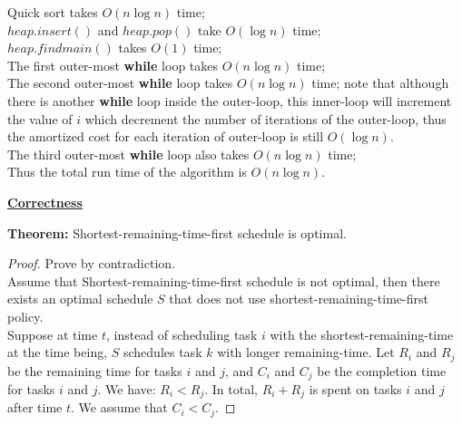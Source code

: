 \documentclass[11pt]{article}
\begin{document}
\begin{enumerate}
\begin{enumerate}
Quick sort takes $O(n\log n)$ time;\\
$heap.insert()$ and $heap.pop()$ take $O(\log n)$ time;\\
$heap.findmain()$ takes $O(1)$ time;\\
The first outer-most \textbf{while} loop takes $O(n\log n)$ time;\\
The second outer-most \textbf{while} loop takes $O(n\log n)$ time;
note that although there is another \textbf{while} loop inside the
outer-loop, this inner-loop will increment the value of $i$
which decrement the number of iterations of the outer-loop, thus the
amortized cost for each iteration of outer-loop is still $O(\log
n)$.\\
The third outer-most \textbf{while} loop also takes $O(n\log n)$ time;\\
Thus the total run time of the algorithm is $O(n\log n)$.

\underline{\textbf{Correctness}}

\textbf{Theorem:} Shortest-remaining-time-first schedule is optimal.

\begin{proof}
  Prove by contradiction.\\
  Assume that Shortest-remaining-time-first schedule is not
  optimal, then there exists an optimal schedule $S$ that does not use
  shortest-remaining-time-first policy.\\
  Suppose at time $t$, instead of scheduling task $i$ with the
  shortest-remaining-time at the time being, $S$ schedules task $k$
  with longer remaining-time. Let $R_i$ and $R_j$ be the remaining
  time for tasks $i$ and $j$, and $C_i$ and $C_j$ be the completion
  time for tasks $i$ and $j$. We have: $R_i < R_j$. In total, $R_i + 
  R_j$ is spent on tasks $i$ and $j$ after time $t$. We assume that
  $C_i < C_j$. 


\end{proof}
\end{enumerate}
\end{enumerate}
\end{document}
